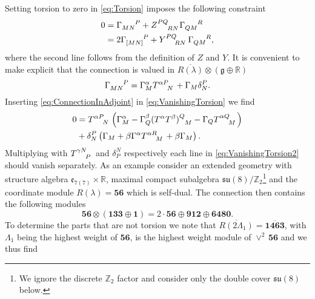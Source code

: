 Setting torsion to zero in \eqref{eq:Torsion} imposes the following constraint 
\begin{equation}\label{eq:VanishingTorsion}
    \begin{aligned}
        0 &= \tensor{\Gamma}{_{MN}^P} +\tensor{Z}{^{PQ}_{RN}}\tensor{\Gamma}{_{QM}^R}\\
          &= 2\tensor{\Gamma}{_{[MN]}^P} +\tensor{Y}{^{PQ}_{RN}}\tensor{\Gamma}{_{QM}^R},
    \end{aligned}
\end{equation}
where the second line follows from the definition of $Z$ and $Y$. It is convenient to make explicit that the connection is valued in $\overbar{R(\lambda)}\otimes(\mathfrak{g}\oplus\mathbb{R})$
\begin{equation}\label{eq:ConnectionInAdjoint}
    \tensor{\Gamma}{_{MN}^P} = \Gamma_M^\alpha\tensor{T}{^\alpha ^P_N}+\Gamma_M\delta^P_N.
\end{equation}
Inserting \eqref{eq:ConnectionInAdjoint} in \eqref{eq:VanishingTorsion} we find 
\begin{equation}\label{eq:VanishingTorsion2}
    \begin{aligned}
    0 &= \tensor{T}{^{\alpha P}_N}\left(\Gamma_M^\alpha-\Gamma_Q^\beta(T^\alpha T^\beta)\tensor{}{^Q_M}-\Gamma_Q\tensor{T}{^{\alpha Q}_M}\right)\\
    &+ \delta^P_N\left(\Gamma_M+\beta\Gamma^\alpha\tensor{T}{^{\alpha R}_M}+\beta\Gamma_M\right).
    \end{aligned}
\end{equation}
Multiplying with $\tensor{T}{^{\gamma N}_P}$ and $\delta^N_P$ respectively each line in \eqref{eq:VanishingTorsion2} should vanish separately.
As an example consider an extended geometry with structure algebra $\mathfrak{e}_{7(7)}\times\mathbb{R}$, maximal compact subalgebra $\mathfrak{su}(8)/\mathbb{Z}_2$\footnote{We ignore the discrete $\mathbb{Z}_2$ factor and consider only the double cover $\mathfrak{su}(8)$ below.} and the coordinate module $R(\lambda)=\mathbf{56}$ which is self-dual. The connection then contains the following modules 
\begin{equation}
    \mathbf{56}\otimes\left(\mathbf{133}\oplus\mathbf{1}\right) = 2\cdot \mathbf{56}\oplus\mathbf{912}\oplus\mathbf{6480}.
\end{equation}
To determine the parts that are not torsion we note that $\overbar{R(2\Lambda_1)}=\overbar{\mathbf{1463}}$, with $\Lambda_1$ being the highest weight of $\mathbf{56}$, is the highest weight module of $\vee^2\,\mathbf{56}$ and we thus find 
